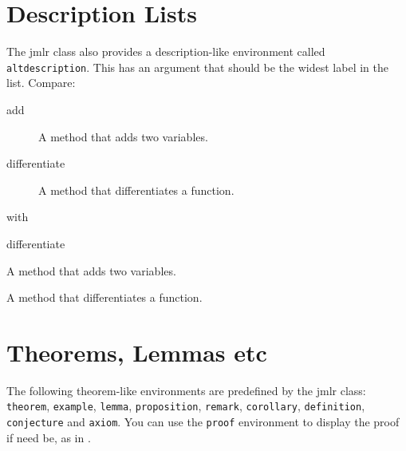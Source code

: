 \documentclass[pmlr]{jmlr}
\begin{document}
\section{Description Lists}

The \textsf{jmlr} class also provides a description-like 
environment called \texttt{altdescription}. This has an
argument that should be the widest label in the list. Compare:
\begin{description}
\item[add] A method that adds two variables.
\item[differentiate] A method that differentiates a function.
\end{description}
with
\begin{altdescription}{differentiate}
\item[add] A method that adds two variables.
\item[differentiate] A method that differentiates a function.
\end{altdescription}

\section{Theorems, Lemmas etc}
\label{sec:theorems}

The following theorem-like environments are predefined by
the \textsf{jmlr} class: \texttt{theorem}, \texttt{example},
\texttt{lemma}, \texttt{proposition}, \texttt{remark}, 
\texttt{corollary}, \texttt{definition}, \texttt{conjecture}
and \texttt{axiom}. You can use the \texttt{proof} environment
to display the proof if need be, as in .
\end{document}
